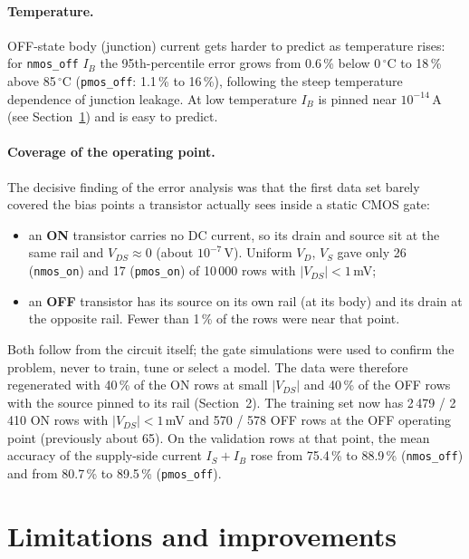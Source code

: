 \paragraph{Temperature.}
OFF-state body (junction) current gets harder to predict as temperature rises: for
\texttt{nmos\_off} $I_B$ the 95th-percentile error grows from 0.6\,\% below 0\,$^\circ$C to
18\,\% above 85\,$^\circ$C (\texttt{pmos\_off}: 1.1\,\% to 16\,\%), following the steep
temperature dependence of junction leakage. At low temperature $I_B$ is pinned near
$10^{-14}$\,A (see Section~\ref{sec:limitations}) and is easy to predict.

\paragraph{Coverage of the operating point.}
The decisive finding of the error analysis was that the first data set barely covered the bias
points a transistor actually sees inside a static CMOS gate:
\begin{itemize}
  \item an \textbf{ON} transistor carries no DC current, so its drain and source sit at the same
        rail and $V_{DS}\approx0$ (about $10^{-7}$\,V). Uniform $V_D$, $V_S$ gave only 26
        (\texttt{nmos\_on}) and 17 (\texttt{pmos\_on}) of 10\,000 rows with $|V_{DS}|<1$\,mV;
  \item an \textbf{OFF} transistor has its source on its own rail (at its body) and its drain at
        the opposite rail. Fewer than 1\,\% of the rows were near that point.
\end{itemize}
Both follow from the circuit itself; the gate simulations were used to confirm the problem,
never to train, tune or select a model. The data were therefore regenerated with 40\,\% of the
ON rows at small $|V_{DS}|$ and 40\,\% of the OFF rows with the source pinned to its rail
(Section~2). The training set now has 2\,479 / 2\,410 ON rows with $|V_{DS}|<1$\,mV and
570 / 578 OFF rows at the OFF operating point (previously about 65). On the validation rows at
that point, the mean accuracy of the supply-side current $I_S+I_B$ rose from 75.4\,\% to
88.9\,\% (\texttt{nmos\_off}) and from 80.7\,\% to 89.5\,\% (\texttt{pmos\_off}).


\section{Limitations and improvements}\label{sec:limitations}

